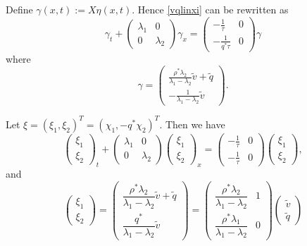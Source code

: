 \documentclass[preprint]{elsarticle}
\begin{document}
Define $\gamma(x,t) := X\eta(x,t)$. Hence \eqref{vqlinxi} can be rewritten as
\begin{equation} 
\gamma_t + \begin{pmatrix}
\lambda_1 & 0 \\
0 & \lambda_2
\end{pmatrix} \gamma_x = \begin{pmatrix}
-\frac{1}{\tau} & 0 \\
-\frac{1}{q^* \tau} & 0
\end{pmatrix} \gamma
\end{equation}
where 
\begin{equation}
\gamma = \begin{pmatrix}
\frac{\rho^*\lambda_2}{\lambda_1 - \lambda_2}\tilde{v} + \tilde{q} \\ 
-\frac{1}{\lambda_1 - \lambda_2}\tilde{v} 
\end{pmatrix}. 
\end{equation}

Let $\xi = (\xi_1, \xi_2)^T = (\chi_1, -q^*\chi_2)^T$. Then we have
\begin{equation} \label{vqlindiag}
\begin{pmatrix}
\xi_1 \\ \xi_2
\end{pmatrix}_t + \begin{pmatrix}
\lambda_1 & 0 \\
0 & \lambda_2
\end{pmatrix} \begin{pmatrix}
\xi_1 \\ \xi_2
\end{pmatrix}_x = \begin{pmatrix}
-\frac{1}{\tau} & 0 \\
-\frac{1}{\tau} & 0
\end{pmatrix} \begin{pmatrix}
\xi_1 \\ \xi_2
\end{pmatrix},
\end{equation}
and
\begin{equation} \label{eq:Riemannzeta}
\begin{pmatrix}
\xi_1 \\ \xi_2
\end{pmatrix} = \begin{pmatrix}
\dfrac{\rho^*\lambda_2}{\lambda_1 - \lambda_2}\tilde{v} + \tilde{q} \\ 
\dfrac{q^*}{\lambda_1 - \lambda_2}\tilde{v} 
\end{pmatrix} = 
\begin{pmatrix}
\dfrac{\rho^*\lambda_2}{\lambda_1-\lambda_2} & 1\\
\dfrac{\rho^*\lambda_1}{\lambda_1-\lambda_2} & 0
\end{pmatrix} \begin{pmatrix}
\tilde{v} \\ \tilde{q} 
\end{pmatrix}
\end{equation}
\end{document}
